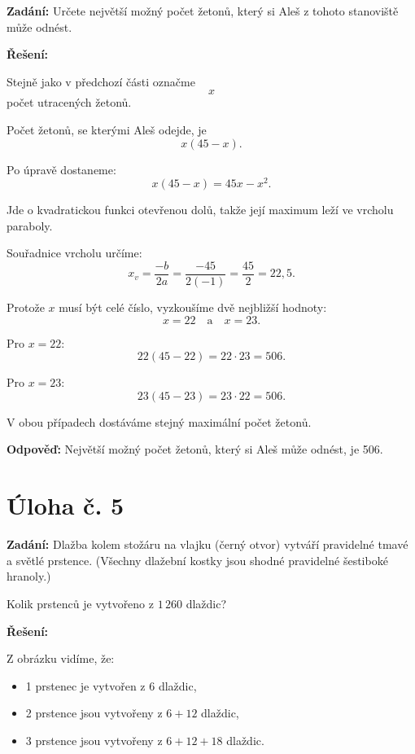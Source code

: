 \documentclass[12pt,a4paper]{article}
\begin{document}
\textbf{Zadání:}  
Určete největší možný počet žetonů, který si Aleš z tohoto stanoviště může odnést.

\bigskip

\textbf{Řešení:}

Stejně jako v předchozí části označme
\[
x
\]
počet utracených žetonů.

Počet žetonů, se kterými Aleš odejde, je
\[
x(45-x).
\]

Po úpravě dostaneme:
\[
x(45-x)=45x-x^2.
\]

Jde o kvadratickou funkci otevřenou dolů, takže její maximum leží ve vrcholu paraboly.

Souřadnice vrcholu určíme:
\[
x_v=\frac{-b}{2a}=\frac{-45}{2(-1)}=\frac{45}{2}=22{,}5.
\]

Protože \(x\) musí být celé číslo, vyzkoušíme dvě nejbližší hodnoty:
\[
x=22 \quad \text{a} \quad x=23.
\]

Pro \(x=22\):
\[
22(45-22)=22\cdot 23=506.
\]

Pro \(x=23\):
\[
23(45-23)=23\cdot 22=506.
\]

V obou případech dostáváme stejný maximální počet žetonů.

\bigskip

\textbf{Odpověď:}  
Největší možný počet žetonů, který si Aleš může odnést, je 506.


\newpage
\section*{Úloha č. 5}

\textbf{Zadání:}  
Dlažba kolem stožáru na vlajku (černý otvor) vytváří pravidelné tmavé a světlé prstence.  
(Všechny dlažební kostky jsou shodné pravidelné šestiboké hranoly.)

Kolik prstenců je vytvořeno z \(1\,260\) dlaždic?

\bigskip

\textbf{Řešení:}

Z obrázku vidíme, že:
\begin{itemize}
    \item 1 prstenec je vytvořen z \(6\) dlaždic,
    \item 2 prstence jsou vytvořeny z \(6+12\) dlaždic,
    \item 3 prstence jsou vytvořeny z \(6+12+18\) dlaždic.
\end{itemize}
\end{document}
